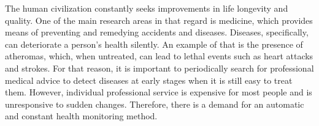
The human civilization constantly seeks improvements in life longevity and quality. One of the main research areas in that regard is medicine, which provides means of preventing and remedying accidents and diseases. Diseases, specifically, can deteriorate a person's health silently. An example of that is the presence of atheromas, which, when untreated, can lead to lethal events such as heart attacks and strokes. For that reason, it is important to periodically search for professional medical advice to detect diseases at early stages when it is still easy to treat them. However, individual professional service is expensive for most people and is unresponsive to sudden changes. Therefore, there is a demand for an automatic and constant health monitoring method.  

